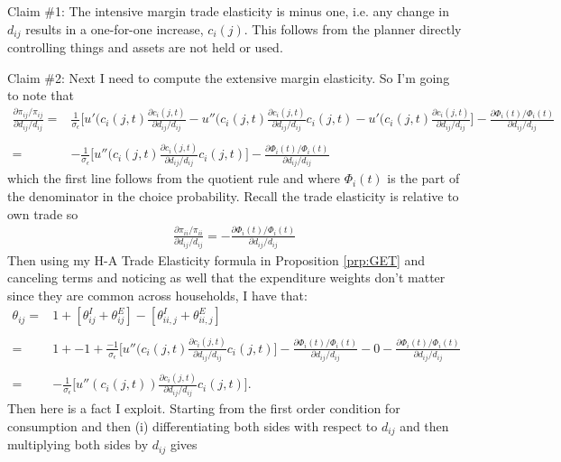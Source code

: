 \documentclass[12pt,pdftex]{article}
\begin{document}
\begin{onehalfspacing}
Claim \#1: The intensive margin trade elasticity is minus one, i.e. any change in $d_{ij}$ results in a one-for-one increase, $c_{i}(j)$. This follows from the planner directly controlling things and assets are not held or used.

Claim \#2: Next I need to compute the extensive margin elasticity. So I'm going to note that
\begin{align}
\frac{\partial \pi_{ij} / \pi_{ij}}{\partial d_{ij} / d_{ij}} =& \frac{1}{\sigma_{\epsilon}} \bigg [ u'(c_{i}(j,t)\frac{\partial c_{i}(j,t)}{\partial d_{ij}/ d_{ij}} - u''(c_{i}(j,t)\frac{\partial c_{i}(j,t)}{\partial d_{ij}/ d_{ij}}c_{i}(j,t) - u'(c_{i}(j,t)\frac{\partial c_{i}(j,t)}{\partial d_{ij}/ d_{ij}} \bigg] - \frac{\partial \Phi_{i}(t) /\Phi_i(t)}{\partial d_{ij}/ d_{ij}} \\
\nonumber \\
=& -\frac{1}{\sigma_{\epsilon}} \bigg [ u''(c_{i}(j,t)\frac{\partial c_{i}(j,t)}{\partial d_{ij}/ d_{ij}}c_{i}(j,t) \bigg] - \frac{\partial \Phi_{i}(t) /\Phi_i(t)}{\partial d_{ij}/ d_{ij}}
\end{align}
which the first line follows from the quotient rule and where $\Phi_{i}(t)$ is the part of the denominator in the choice probability. Recall the trade elasticity is relative to own trade so
\begin{align}
\frac{\partial \pi_{ii} / \pi_{ii}}{\partial d_{ij} / d_{ij}} = - \frac{\partial \Phi_{i}(t) /\Phi_i(t)}{\partial d_{ij}/ d_{ij}}
\end{align}
Then using my H-A Trade Elasticity formula in Proposition \ref{prp:GET} and canceling terms and noticing as well that the expenditure weights don't matter since they are common across households, I have that:
\begin{align}
\theta_{ij} =& 1 + \left [\theta_{ij}^{I} + \theta_{ij}^{E} \right ]  - \left [ \theta_{ii,j}^{I} + \theta_{ii,j}^{E} \right ]  \\
\nonumber \\
= & 1 + -1 + \frac{-1}{\sigma_{\epsilon}} \bigg [ u''(c_{i}(j,t)\frac{\partial c_{i}(j,t)}{\partial d_{ij}/ d_{ij}}c_{i}(j,t) \bigg] - \frac{\partial \Phi_{i}(t) /\Phi_i(t)}{\partial d_{ij}/ d_{ij}} - 0  - \frac{\partial \Phi_{i}(t) /\Phi_i(t)}{\partial d_{ij}/ d_{ij}} \\
\nonumber \\
= & -\frac{1}{\sigma_{\epsilon}} \bigg [ u''(c_{i}(j,t))\frac{\partial c_{i}(j,t)}{\partial d_{ij}/ d_{ij}}c_{i}(j,t) \bigg].
\end{align}
Then here is a fact I exploit. Starting from the first order condition for consumption and then (i) differentiating both sides with respect to $d_{ij}$ and then multiplying both sides by $d_{ij}$ gives

\end{onehalfspacing}
\end{document}
